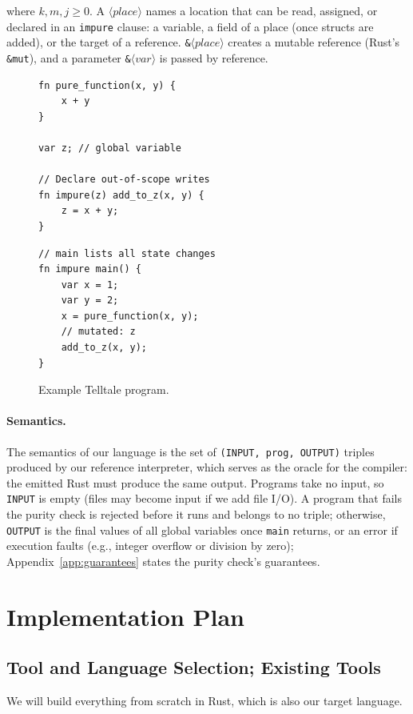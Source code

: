 \documentclass[12pt, letterpaper]{article}
\newcommand{\nt}[1]{\ensuremath{\langle\textit{#1}\rangle}}
\begin{document}
\noindent where $k, m, j \geq 0$.
A \nt{place} names a location that can be read, assigned, or declared in an \texttt{impure} clause: a variable, a field of a place (once structs are added), or the target of a reference.
\texttt{\&}\nt{place} creates a mutable reference (Rust's \texttt{\&mut}), and a parameter \texttt{\&}\nt{var} is passed by reference.

\begin{figure}[tb]
\begin{minipage}[t]{0.48\linewidth}
\begin{lstlisting}
fn pure_function(x, y) {
    x + y
}

var z; // global variable

// Declare out-of-scope writes
fn impure(z) add_to_z(x, y) {
    z = x + y;
}
\end{lstlisting}
\end{minipage}\hfill
\begin{minipage}[t]{0.48\linewidth}
\begin{lstlisting}
// main lists all state changes
fn impure main() {
    var x = 1;
    var y = 2;
    x = pure_function(x, y);
    // mutated: z
    add_to_z(x, y);
}
\end{lstlisting}
\end{minipage}
\caption{Example Telltale program.}
\label{fig:example}
\end{figure}

\paragraph{Semantics.} The semantics of our language is the set of \texttt{(INPUT, prog, OUTPUT)} triples produced by our reference interpreter, which serves as the oracle for the compiler: the emitted Rust must produce the same output.
Programs take no input, so \texttt{INPUT} is empty (files may become input if we add file I/O).
A program that fails the purity check is rejected before it runs and belongs to no triple; otherwise, \texttt{OUTPUT} is the final values of all global variables once \texttt{main} returns, or an error if execution faults (e.g., integer overflow or division by zero); Appendix~\ref{app:guarantees} states the purity check's guarantees.

\section{Implementation Plan}

\subsection{Tool and Language Selection; Existing Tools}
We will build everything from scratch in Rust, which is also our target language.
\end{document}
